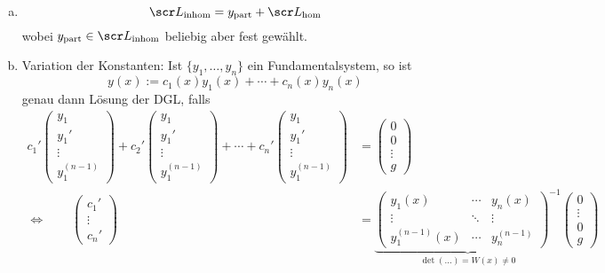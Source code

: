 \begin{kor}[Folgerung]
\begin{enumerate}[1)]
			\begin{enumerate}[a)]
				\item
					\[
						\scr L_{\text{inhom}} = y_{\text{part}} + \scr L_{\text{hom}}
					\]
					wobei $y_{\text{part}} \in \scr L_{\text{inhom}}$ beliebig aber fest gewählt.
				\item
					Variation der Konstanten: Ist $\{y_1, \dotsc, y_n\}$ ein Fundamentalsystem, so ist
					\[
						y(x) := c_1(x) y_1(x) + \dotsb + c_n(x)y_n(x)
					\]
					genau dann Lösung der DGL, falls
					\begin{align*}
						c_1' \begin{pmatrix}
							y_1 \\ y_1' \\ \vdots \\ y_1^{(n-1)}
						\end{pmatrix} +
						c_2' \begin{pmatrix}
							y_1 \\ y_1' \\ \vdots \\ y_1^{(n-1)}
						\end{pmatrix} + \dotsb +
						c_n' \begin{pmatrix}
							y_1 \\ y_1' \\ \vdots \\ y_1^{(n-1)}
						\end{pmatrix} &= \begin{pmatrix}
							0 \\ 0 \\ \vdots \\ g
						\end{pmatrix} \\
						\iff \qquad
						\begin{pmatrix}
							c_1' \\ \vdots \\ c_n'
						\end{pmatrix} &=
						\underbrace{\begin{pmatrix}
							y_1(x) & \cdots & y_n(x) \\
							\vdots & \ddots & \vdots \\
							y_1^{(n-1)}(x) & \cdots & y_n^{(n-1)}
						\end{pmatrix}^{-1}}_{\det(\dotso) = W(x) \neq 0} \begin{pmatrix}
							0 \\ \vdots \\ 0 \\ g
						\end{pmatrix}
					\end{align*}
			\end{enumerate}
	\end{enumerate}
\end{kor}


